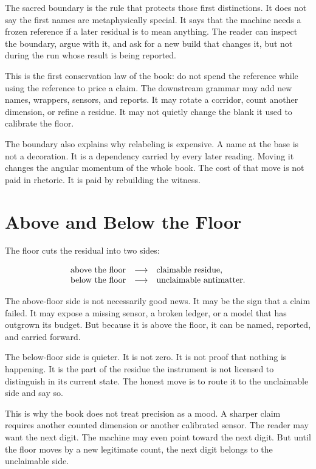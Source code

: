 The sacred boundary is the rule that protects those first distinctions. It
does not say the first names are metaphysically special. It says that the
machine needs a frozen reference if a later residual is to mean anything. The
reader can inspect the boundary, argue with it, and ask for a new build that
changes it, but not during the run whose result is being reported.

This is the first conservation law of the book: do not spend the reference
while using the reference to price a claim. The downstream grammar may add new
names, wrappers, sensors, and reports. It may rotate a corridor, count another
dimension, or refine a residue. It may not quietly change the blank it used to
calibrate the floor.

The boundary also explains why relabeling is expensive. A name at the base is
not a decoration. It is a dependency carried by every later reading. Moving it
changes the angular momentum of the whole book. The cost of that move is not
paid in rhetoric. It is paid by rebuilding the witness.

\section{Above and Below the Floor}

The floor cuts the residual into two sides:

\[
\begin{array}{rcl}
\hbox{above the floor} &\longrightarrow& \hbox{claimable residue},\\
\hbox{below the floor} &\longrightarrow& \hbox{unclaimable antimatter}.
\end{array}
\]

The above-floor side is not necessarily good news. It may be the sign that a
claim failed. It may expose a missing sensor, a broken ledger, or a model that
has outgrown its budget. But because it is above the floor, it can be named,
reported, and carried forward.

The below-floor side is quieter. It is not zero. It is not proof that nothing
is happening. It is the part of the residue the instrument is not licensed to
distinguish in its current state. The honest move is to route it to the
unclaimable side and say so.

This is why the book does not treat precision as a mood. A sharper claim
requires another counted dimension or another calibrated sensor. The reader may
want the next digit. The machine may even point toward the next digit. But
until the floor moves by a new legitimate count, the next digit belongs to the
unclaimable side.

